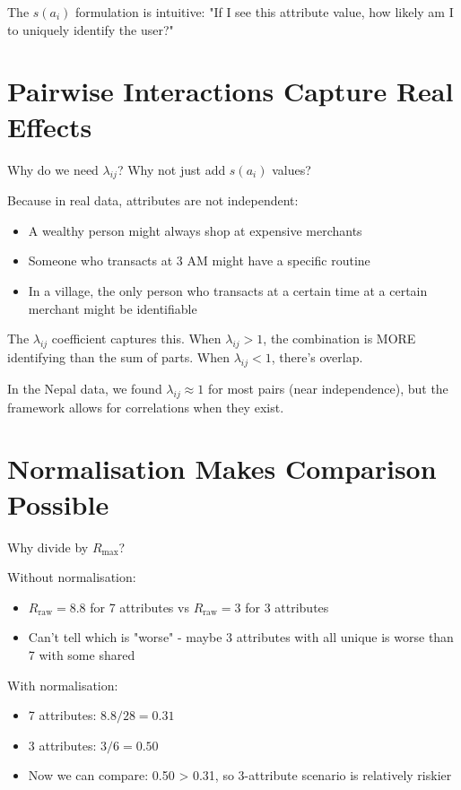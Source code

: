 \documentclass[12pt,a4paper,oneside,openany]{report}
\begin{document}
The $s(a_i)$ formulation is intuitive: "If I see this attribute value, how likely am I to uniquely identify the user?"

\section{Pairwise Interactions Capture Real Effects}
\label{sec:why_interact}

Why do we need $\lambda_{ij}$? Why not just add $s(a_i)$ values?

Because in real data, attributes are not independent:

\begin{itemize}
    \item A wealthy person might always shop at expensive merchants
    \item Someone who transacts at 3 AM might have a specific routine
    \item In a village, the only person who transacts at a certain time at a certain merchant might be identifiable
\end{itemize}

The $\lambda_{ij}$ coefficient captures this. When $\lambda_{ij} > 1$, the combination is MORE identifying than the sum of parts. When $\lambda_{ij} < 1$, there's overlap.

In the Nepal data, we found $\lambda_{ij} \approx 1$ for most pairs (near independence), but the framework allows for correlations when they exist.

\section{Normalisation Makes Comparison Possible}
\label{sec:why_norm}

Why divide by $R_{\mathrm{max}}$?

Without normalisation:
\begin{itemize}
    \item $R_{\mathrm{raw}} = 8.8$ for 7 attributes vs $R_{\mathrm{raw}} = 3$ for 3 attributes
    \item Can't tell which is "worse" - maybe 3 attributes with all unique is worse than 7 with some shared
\end{itemize}

With normalisation:
\begin{itemize}
    \item 7 attributes: $8.8 / 28 = 0.31$
    \item 3 attributes: $3 / 6 = 0.50$
    \item Now we can compare: 0.50 > 0.31, so 3-attribute scenario is relatively riskier
\end{itemize}
\end{document}
